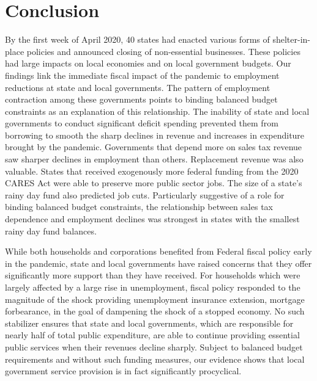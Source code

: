 
\section{Conclusion}

By the first week of April 2020, 40 states had enacted various forms of shelter-in-place policies and announced closing of non-essential businesses. 
These policies had large impacts on local economies and on local government budgets. 
Our findings link the immediate fiscal impact of the pandemic to employment reductions at state and local governments. 
The pattern of employment contraction among these governments points to binding balanced budget constraints as an explanation of this relationship. 
The inability of state and local governments to conduct significant deficit spending prevented them from borrowing to smooth the sharp declines in revenue and increases in expenditure brought by the pandemic. Governments that depend more on sales tax revenue saw sharper declines in employment than others. Replacement revenue was also valuable. States that received exogenously more federal funding from the 2020 CARES Act were able to preserve more public sector jobs. The size of a state's rainy day fund also predicted job cuts. Particularly suggestive of a role for binding balanced budget constraints, the relationship between sales tax dependence and employment declines was strongest in states with the smallest rainy day fund balances. 

While both households and corporations benefited from Federal fiscal policy early in the pandemic, state and local governments have raised concerns that they offer significantly more support than they have received. For  households which were largely affected by a large rise in unemployment, fiscal policy responded to the magnitude of the shock providing unemployment insurance extension, mortgage forbearance, in the goal of dampening the shock of a stopped economy. No such stabilizer ensures that state and local governments, which are responsible for nearly half of total public expenditure, are able to continue providing essential public services when their revenues decline sharply. Subject to balanced budget requirements and without such funding measures, our evidence shows that local government service provision is in fact significantly procyclical. 
